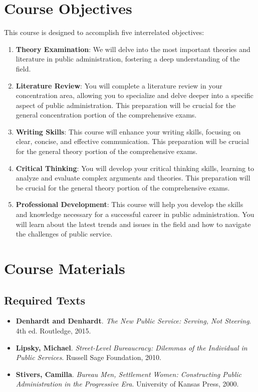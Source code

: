 \documentclass[12pt, letterpaper]{article}
\begin{document}
    \section{Course Objectives}
    This course is designed to accomplish five interrelated objectives:
    
    \begin{enumerate}
        \item \textbf{Theory Examination}: We will delve into the most important theories and literature in public administration, fostering a deep understanding of the field.
        \item \textbf{Literature Review}: You will complete a literature review in your concentration area, allowing you to specialize and delve deeper into a specific aspect of public administration. This preparation will be crucial for the general concentration portion of the comprehensive exams.
        \item \textbf{Writing Skills}: This course will enhance your writing skills, focusing on clear, concise, and effective communication. This preparation will be crucial for the general theory portion of the comprehensive exams.
        \item \textbf{Critical Thinking}: You will develop your critical thinking skills, learning to analyze and evaluate complex arguments and theories. This preparation will be crucial for the general theory portion of the comprehensive exams.
        \item \textbf{Professional Development}: This course will help you develop the skills and knowledge necessary for a successful career in public administration. You will learn about the latest trends and issues in the field and how to navigate the challenges of public service.
    
    \end{enumerate}
    
    \section{Course Materials}
    \subsection*{Required Texts}
    \begin{itemize}
        \item \textbf{Denhardt and Denhardt}. \textit{The New Public Service: Serving, Not Steering}. 4th ed. Routledge, 2015.
        \item \textbf{Lipsky, Michael}. \textit{Street-Level Bureaucracy: Dilemmas of the Individual in Public Services}. Russell Sage Foundation, 2010.
        \item \textbf{Stivers, Camilla}. \textit{Bureau Men, Settlement Women: Constructing Public Administration in the Progressive Era}. University of Kansas Press, 2000.
    \end{itemize}
\end{document}
